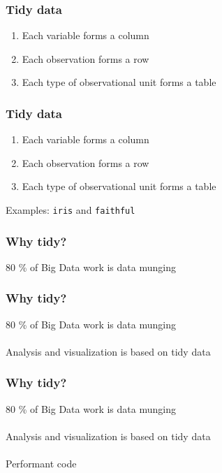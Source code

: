 \documentclass{beamer}
\begin{document}
\begin{frame}
	\frametitle{Tidy data}
	\begin{center}
		\begin{enumerate}
			\item Each variable forms a column
			\item Each observation forms a row
			\item Each type of observational unit forms a table
		\end{enumerate}
	\end{center}
\end{frame}

\begin{frame}
	\frametitle{Tidy data}
	\begin{center}
		\begin{enumerate}
			\item Each variable forms a column
			\item Each observation forms a row
			\item Each type of observational unit forms a table
		\end{enumerate}
		\medskip
		Examples: \texttt{iris} and \texttt{faithful}
	\end{center}
\end{frame}


\begin{frame}
	\frametitle{Why tidy?}
	\begin{center}
		80 \% of Big Data work is data munging\\
	\end{center}
\end{frame}

\begin{frame}
	\frametitle{Why tidy?}
	\begin{center}
		80 \% of Big Data work is data munging\\~\\
		Analysis and visualization is based on tidy data
	\end{center}
\end{frame}

\begin{frame}
	\frametitle{Why tidy?}
	\begin{center}
		80 \% of Big Data work is data munging\\~\\
		Analysis and visualization is based on tidy data\\~\\
		Performant code
	\end{center}
\end{frame}
\end{document}
